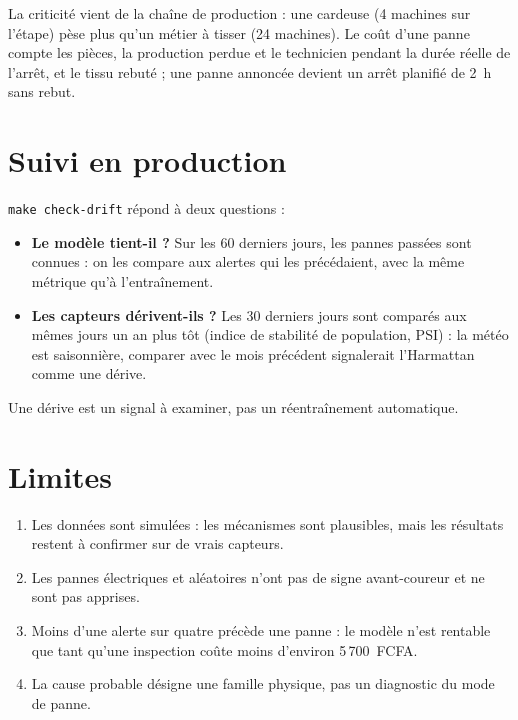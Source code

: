 \documentclass[11pt,a4paper]{article}
\newcommand{\var}[1]{\texttt{#1}}
\begin{document}
La criticité vient de la chaîne de production : une cardeuse (4 machines sur l'étape) pèse plus qu'un métier à tisser
(24 machines). Le coût d'une panne compte les pièces, la production perdue et le technicien pendant la durée réelle
de l'arrêt, et le tissu rebuté ; une panne annoncée devient un arrêt planifié de 2~h sans rebut.

\section{Suivi en production}

\var{make check-drift} répond à deux questions :
\begin{itemize}
  \item \textbf{Le modèle tient-il ?} Sur les 60 derniers jours, les pannes passées sont connues : on les compare aux
        alertes qui les précédaient, avec la même métrique qu'à l'entraînement.
  \item \textbf{Les capteurs dérivent-ils ?} Les 30 derniers jours sont comparés aux mêmes jours un an plus tôt
        (indice de stabilité de population, PSI) : la météo est saisonnière, comparer avec le mois précédent
        signalerait l'Harmattan comme une dérive.
\end{itemize}
Une dérive est un signal à examiner, pas un réentraînement automatique.

\section{Limites}

\begin{enumerate}
  \item Les données sont simulées : les mécanismes sont plausibles, mais les résultats restent à confirmer sur de vrais
        capteurs.
  \item Les pannes électriques et aléatoires n'ont pas de signe avant-coureur et ne sont pas apprises.
  \item Moins d'une alerte sur quatre précède une panne : le modèle n'est rentable que tant qu'une inspection coûte
        moins d'environ 5\,700~FCFA.
  \item La cause probable désigne une famille physique, pas un diagnostic du mode de panne.
\end{enumerate}
\end{document}

